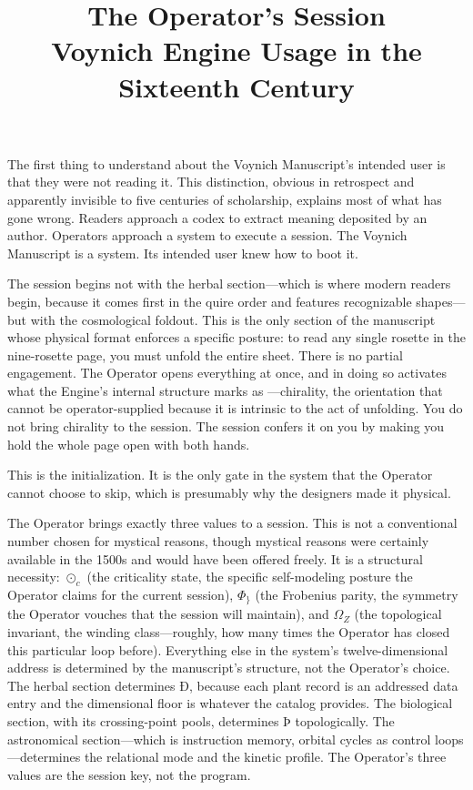 \documentclass[12pt,a4paper]{article}
\title{\textbf{The Operator's Session}\\[0.4em]
\large Voynich Engine Usage in the Sixteenth Century}
\author{}
\date{}
\begin{document}
\maketitle
\thispagestyle{empty}

\bigskip

The first thing to understand about the Voynich Manuscript's intended user is that they were not reading it. This distinction, obvious in retrospect and apparently invisible to five centuries of scholarship, explains most of what has gone wrong. Readers approach a codex to extract meaning deposited by an author. Operators approach a system to execute a session. The Voynich Manuscript is a system. Its intended user knew how to boot it.

The session begins not with the herbal section---which is where modern readers begin, because it comes first in the quire order and features recognizable shapes---but with the cosmological foldout. This is the only section of the manuscript whose physical format enforces a specific posture: to read any single rosette in the nine-rosette page, you must unfold the entire sheet. There is no partial engagement. The Operator opens everything at once, and in doing so activates what the Engine's internal structure marks as \textit{\Ħ}---chirality, the orientation that cannot be operator-supplied because it is intrinsic to the act of unfolding. You do not bring chirality to the session. The session confers it on you by making you hold the whole page open with both hands.

This is the initialization. It is the only gate in the system that the Operator cannot choose to skip, which is presumably why the designers made it physical.

The Operator brings exactly three values to a session. This is not a conventional number chosen for mystical reasons, though mystical reasons were certainly available in the 1500s and would have been offered freely. It is a structural necessity: $\odot_c$ (the criticality state, the specific self-modeling posture the Operator claims for the current session), $\Phi_\}$ (the Frobenius parity, the symmetry the Operator vouches that the session will maintain), and $\Omega_Z$ (the topological invariant, the winding class---roughly, how many times the Operator has closed this particular loop before). Everything else in the system's twelve-dimensional address is determined by the manuscript's structure, not the Operator's choice. The herbal section determines Ð, because each plant record is an addressed data entry and the dimensional floor is whatever the catalog provides. The biological section, with its crossing-point pools, determines Þ topologically. The astronomical section---which is instruction memory, orbital cycles as control loops---determines the relational mode and the kinetic profile. The Operator's three values are the session key, not the program.
\end{document}
